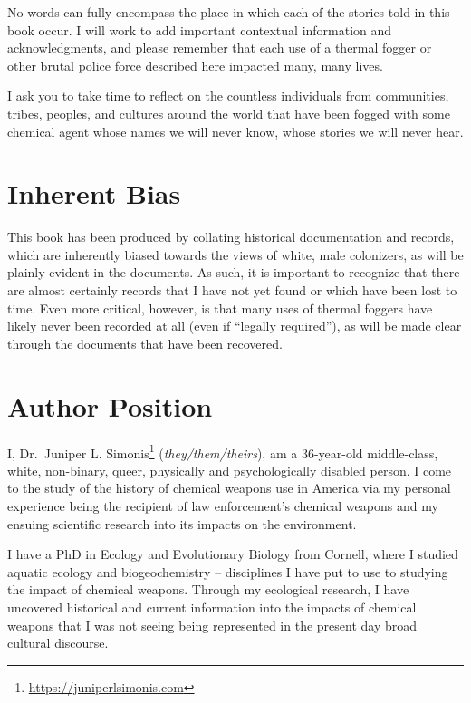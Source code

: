 \documentclass[
  11pt,
  titlepage]{krantz}
\renewcommand{\href}[2]{#2\footnote{\url{#1}}}
\begin{document}
No words can fully encompass the place in which each of the stories told in this book occur.
I will work to add important contextual information and acknowledgments, and please remember that each use of a thermal fogger or other brutal police force described here impacted many, many lives.

I ask you to take time to reflect on the countless individuals from communities, tribes, peoples, and cultures around the world that have been fogged with some chemical agent whose names we will never know, whose stories we will never hear.

\hypertarget{inherent-bias}{%
\section*{Inherent Bias}\label{inherent-bias}}


This book has been produced by collating historical documentation and records, which are inherently biased towards the views of white, male colonizers, as will be plainly evident in the documents.
As such, it is important to recognize that there are almost certainly records that I have not yet found or which have been lost to time.
Even more critical, however, is that many uses of thermal foggers have likely never been recorded at all (even if ``legally required''), as will be made clear through the documents that have been recovered.

\hypertarget{author-position}{%
\section*{Author Position}\label{author-position}}


I, \href{https://juniperlsimonis.com}{Dr.~Juniper L. Simonis} (\emph{they/them/theirs}), am a 36-year-old middle-class, white, non-binary, queer, physically and psychologically disabled person.
I come to the study of the history of chemical weapons use in America via my personal experience being the recipient of law enforcement's chemical weapons and my ensuing scientific research into its impacts on the environment.

I have a PhD in Ecology and Evolutionary Biology from Cornell, where I studied aquatic ecology and biogeochemistry -- disciplines I have put to use to studying the impact of chemical weapons.
Through my ecological research, I have uncovered historical and current information into the impacts of chemical weapons that I was not seeing being represented in the present day broad cultural discourse.
\end{document}
